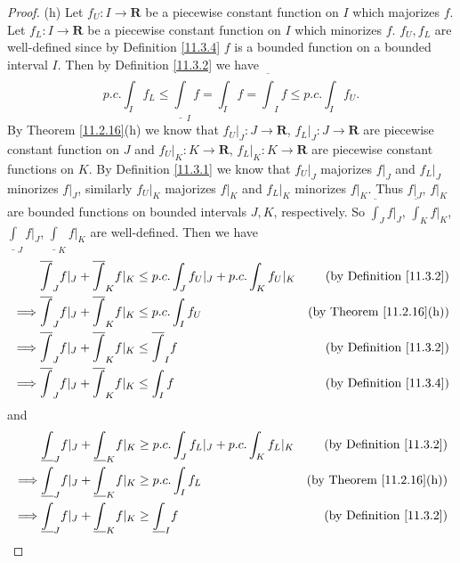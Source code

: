 \begin{proof}{(h)}
    Let \(f_U : I \to \mathbf{R}\) be a piecewise constant function on \(I\) which majorizes \(f\).
    Let \(f_L : I \to \mathbf{R}\) be a piecewise constant function on \(I\) which minorizes \(f\).
    \(f_U, f_L\) are well-defined since by Definition \ref{11.3.4} \(f\) is a bounded function on a bounded interval \(I\).
    Then by Definition \ref{11.3.2} we have
    \[
        p.c. \int_I f_L \leq \underline{\int}_I f = \int_I f = \overline{\int}_I f \leq p.c. \int_I f_U.
    \]
    By Theorem \ref{11.2.16}(h) we know that \(f_U|_J : J \to \mathbf{R}\), \(f_L|_J : J \to \mathbf{R}\) are piecewise constant function on \(J\) and \(f_U|_K : K \to \mathbf{R}\), \(f_L|_K : K \to \mathbf{R}\) are piecewise constant functions on \(K\).
    By Definition \ref{11.3.1} we know that \(f_U|_J\) majorizes \(f|_J\) and \(f_L|_J\) minorizes \(f|_J\), similarly \(f_U|_K\) majorizes \(f|_K\) and \(f_L|_K\) minorizes \(f|_K\).
    Thus \(f|_J\), \(f|_K\) are bounded functions on bounded intervals \(J, K\), respectively.
    So \(\overline{\int}_J f|_J\), \(\overline{\int}_K f|_K\), \(\underline{\int}_J f|_J\), \(\underline{\int}_K f|_K\) are well-defined.
    Then we have
    \begin{align*}
                 & \overline{\int}_J f|_J + \overline{\int}_K f|_K \leq p.c. \int_J f_U|_J + p.c. \int_K f_U|_K & \text{(by Definition \ref{11.3.2})}  \\
        \implies & \overline{\int}_J f|_J + \overline{\int}_K f|_K \leq p.c. \int_I f_U                         & \text{(by Theorem \ref{11.2.16}(h))} \\
        \implies & \overline{\int}_J f|_J + \overline{\int}_K f|_K \leq \overline{\int}_I f                     & \text{(by Definition \ref{11.3.2})}  \\
        \implies & \overline{\int}_J f|_J + \overline{\int}_K f|_K \leq \int_I f                                & \text{(by Definition \ref{11.3.4})}
    \end{align*}
    and
    \begin{align*}
                 & \underline{\int}_J f|_J + \underline{\int}_K f|_K \geq p.c. \int_J f_L|_J + p.c. \int_K f_L|_K & \text{(by Definition \ref{11.3.2})}  \\
        \implies & \underline{\int}_J f|_J + \underline{\int}_K f|_K \geq p.c. \int_I f_L                         & \text{(by Theorem \ref{11.2.16}(h))} \\
        \implies & \underline{\int}_J f|_J + \underline{\int}_K f|_K \geq \underline{\int}_I f                    & \text{(by Definition \ref{11.3.2})}  \\

\end{align*}
\end{proof}
